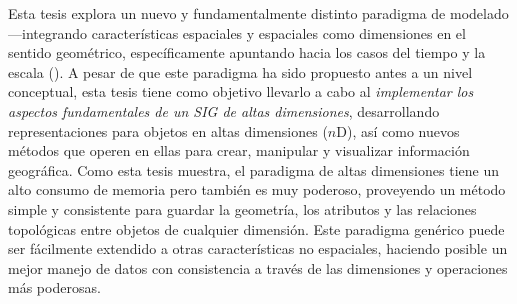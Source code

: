 {Esta tesis explora un nuevo y fundamentalmente distinto paradigma de modelado---integrando características espaciales y espaciales como dimensiones en el sentido geométrico, específicamente apuntando hacia los casos del tiempo y la escala ().
A pesar de que este paradigma ha sido propuesto antes a un nivel conceptual, esta tesis tiene como objetivo llevarlo a cabo al \emph{implementar los aspectos fundamentales de un SIG de altas dimensiones}, desarrollando representaciones para objetos en altas dimensiones ($n$D), así como nuevos métodos que operen en ellas para crear, manipular y visualizar información geográfica.
Como esta tesis muestra, el paradigma de altas dimensiones tiene un alto consumo de memoria pero también es muy poderoso, proveyendo un método simple y consistente para guardar la geometría, los atributos y las relaciones topológicas entre objetos de cualquier dimensión.
Este paradigma genérico puede ser fácilmente extendido a otras características no espaciales, haciendo posible un mejor manejo de datos con consistencia a través de las dimensiones y operaciones más poderosas.

}
